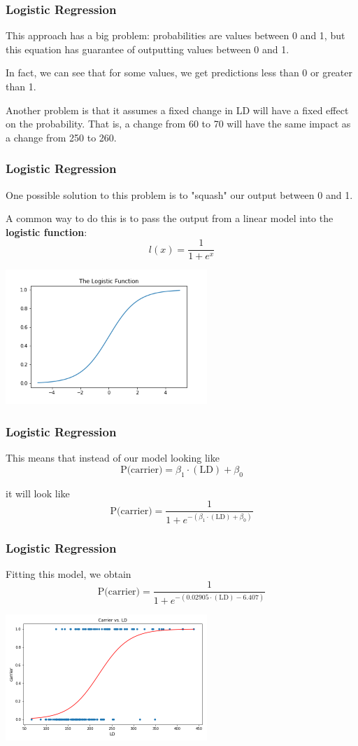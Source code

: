 \documentclass[11pt, table]{beamer}
\begin{document}
\begin{frame}
\frametitle{Logistic Regression}
This approach has a big problem: probabilities are values between 0 and 1, but this equation has guarantee of outputting values between 0 and 1.
\vspace{0.1in}

In fact, we can see that for some values, we get predictions less than 0 or greater than 1.
\vspace{0.1in}

Another problem is that it assumes a fixed change in LD will have a fixed effect on the probability. That is, a change from 60 to 70 will have the same impact as a change from 250 to 260.
\end{frame}

\begin{frame}
\frametitle{Logistic Regression}
One possible solution to this problem is to "squash" our output between 0 and 1.
\vspace{0.1in}

A common way to do this is to pass the output from a linear model into the \textbf{logistic function}:
$$l(x) = \frac{1}{1 + e^{x}}$$

\begin{center}
	\includegraphics[width = 3in]{images/Dystrophy/logistic.png}
\end{center}
\end{frame}

\begin{frame}
\frametitle{Logistic Regression}
This means that instead of our model looking like
$$\text{P(carrier)} = \beta_1\cdot(\text{LD}) + \beta_0$$

it will look like
$$\text{P(carrier)} = \frac{1}{1 + e^{-(\beta_1\cdot(\text{LD}) + \beta_0)}}$$
\end{frame}

\begin{frame}
\frametitle{Logistic Regression}
Fitting this model, we obtain
$$\text{P(carrier)} = \frac{1}{1 + e^{-(0.02905\cdot(\text{LD}) - 6.407)}}$$
\begin{center}
	\includegraphics[width = 3in]{images/Dystrophy/scatter_03.png}
\end{center}

\end{frame}
\end{document}
